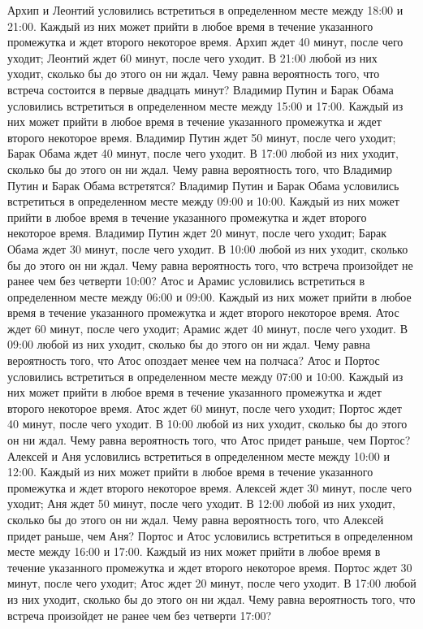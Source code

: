 Архип и Леонтий условились встретиться в определенном месте между 18:00 и 21:00. Каждый из них может прийти в любое время в течение указанного промежутка и ждет второго некоторое время. Архип ждет 40 минут, после чего уходит; Леонтий ждет 60 минут, после чего уходит. В 21:00 любой из них уходит, сколько бы до этого он ни ждал. Чему равна вероятность того, что встреча состоится в первые двадцать минут?
Владимир Путин и Барак Обама условились встретиться в определенном месте между 15:00 и 17:00. Каждый из них может прийти в любое время в течение указанного промежутка и ждет второго некоторое время. Владимир Путин ждет 50 минут, после чего уходит; Барак Обама ждет 40 минут, после чего уходит. В 17:00 любой из них уходит, сколько бы до этого он ни ждал. Чему равна вероятность того, что Владимир Путин и Барак Обама встретятся?
Владимир Путин и Барак Обама условились встретиться в определенном месте между 09:00 и 10:00. Каждый из них может прийти в любое время в течение указанного промежутка и ждет второго некоторое время. Владимир Путин ждет 20 минут, после чего уходит; Барак Обама ждет 30 минут, после чего уходит. В 10:00 любой из них уходит, сколько бы до этого он ни ждал. Чему равна вероятность того, что встреча произойдет не ранее чем без четверти 10:00?
Атос и Арамис условились встретиться в определенном месте между 06:00 и 09:00. Каждый из них может прийти в любое время в течение указанного промежутка и ждет второго некоторое время. Атос ждет 60 минут, после чего уходит; Арамис ждет 40 минут, после чего уходит. В 09:00 любой из них уходит, сколько бы до этого он ни ждал. Чему равна вероятность того, что Атос опоздает менее чем на полчаса?
Атос и Портос условились встретиться в определенном месте между 07:00 и 10:00. Каждый из них может прийти в любое время в течение указанного промежутка и ждет второго некоторое время. Атос ждет 60 минут, после чего уходит; Портос ждет 40 минут, после чего уходит. В 10:00 любой из них уходит, сколько бы до этого он ни ждал. Чему равна вероятность того, что Атос придет раньше, чем Портос?
Алексей и Аня условились встретиться в определенном месте между 10:00 и 12:00. Каждый из них может прийти в любое время в течение указанного промежутка и ждет второго некоторое время. Алексей ждет 30 минут, после чего уходит; Аня ждет 50 минут, после чего уходит. В 12:00 любой из них уходит, сколько бы до этого он ни ждал. Чему равна вероятность того, что Алексей придет раньше, чем Аня?
Портос и Атос условились встретиться в определенном месте между 16:00 и 17:00. Каждый из них может прийти в любое время в течение указанного промежутка и ждет второго некоторое время. Портос ждет 30 минут, после чего уходит; Атос ждет 20 минут, после чего уходит. В 17:00 любой из них уходит, сколько бы до этого он ни ждал. Чему равна вероятность того, что встреча произойдет не ранее чем без четверти 17:00?
